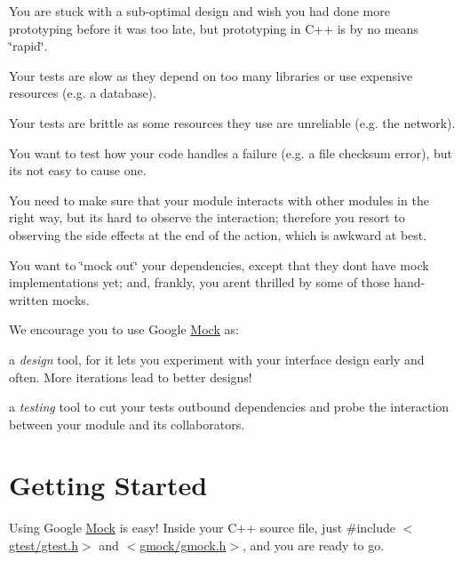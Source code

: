 \begin{DoxyItemize}
\item You are stuck with a sub-\/optimal design and wish you had done more prototyping before it was too late, but prototyping in C++ is by no means \char`\"{}rapid\char`\"{}.
\item Your tests are slow as they depend on too many libraries or use expensive resources (e.\+g. a database).
\item Your tests are brittle as some resources they use are unreliable (e.\+g. the network).
\item You want to test how your code handles a failure (e.\+g. a file checksum error), but it\textquotesingle{}s not easy to cause one.
\item You need to make sure that your module interacts with other modules in the right way, but it\textquotesingle{}s hard to observe the interaction; therefore you resort to observing the side effects at the end of the action, which is awkward at best.
\item You want to \char`\"{}mock out\char`\"{} your dependencies, except that they don\textquotesingle{}t have mock implementations yet; and, frankly, you aren\textquotesingle{}t thrilled by some of those hand-\/written mocks.
\end{DoxyItemize}

We encourage you to use Google \mbox{\hyperlink{class_mock}{Mock}} as\+:


\begin{DoxyItemize}
\item a {\itshape design} tool, for it lets you experiment with your interface design early and often. More iterations lead to better designs!
\item a {\itshape testing} tool to cut your tests\textquotesingle{} outbound dependencies and probe the interaction between your module and its collaborators.
\end{DoxyItemize}

\section*{Getting Started}

Using Google \mbox{\hyperlink{class_mock}{Mock}} is easy! Inside your C++ source file, just {\ttfamily \#include} {\ttfamily $<$\mbox{\hyperlink{gtest_8h_source}{gtest/gtest.\+h}}$>$} and {\ttfamily $<$\mbox{\hyperlink{gmock_8h_source}{gmock/gmock.\+h}}$>$}, and you are ready to go.

